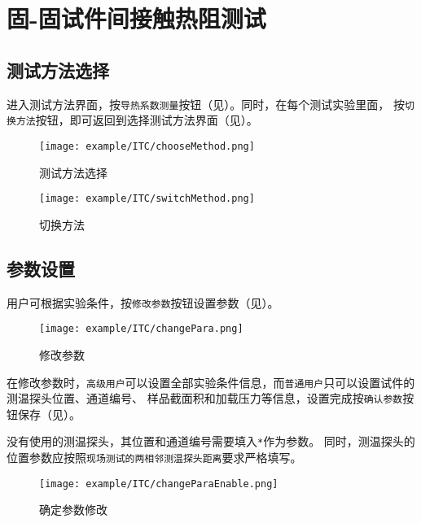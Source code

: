 \section{固-固试件间接触热阻测试}
\subsection{测试方法选择}
进入测试方法界面，按\lstinline{导热系数测量}按钮（见）。同时，在每个测试实验里面，
按\lstinline{切换方法}按钮，即可返回到选择测试方法界面（见）。
\begin{figure}[htbp]
	\centering
	\texttt{[image: example/ITC/chooseMethod.png]}
	\caption{ 测试方法选择 \label{fig:exmp_chooseMethod}}
\end{figure}

\begin{figure}[htbp]
	\centering
	\texttt{[image: example/ITC/switchMethod.png]}
	\caption{ 切换方法 \label{fig:exmp_switchMethod}}
\end{figure}

\subsection{参数设置}
用户可根据实验条件，按\lstinline{修改参数}按钮设置参数（见）。
\begin{figure}[htbp]
	\centering
	\texttt{[image: example/ITC/changePara.png]}
	\caption{ 修改参数 \label{fig:exmp_changePara}}
\end{figure}
在修改参数时，\lstinline{高级用户}可以设置全部实验条件信息，而\lstinline{普通用户}只可以设置试件的测温探头位置、通道编号、
样品截面积和加载压力等信息，设置完成按\lstinline{确认参数}按钮保存（见）。
\begin{note}
没有使用的测温探头，其位置和通道编号需要填入\lstinline{*}作为参数。
同时，测温探头的位置参数应按照\lstinline{现场测试的两相邻测温探头距离}要求严格填写。
\end{note}
\begin{figure}[htbp]
	\centering
	\texttt{[image: example/ITC/changeParaEnable.png]}
	\caption{ 确定参数修改 \label{fig:exmp_changeParaEnable}}
\end{figure}
~\\
